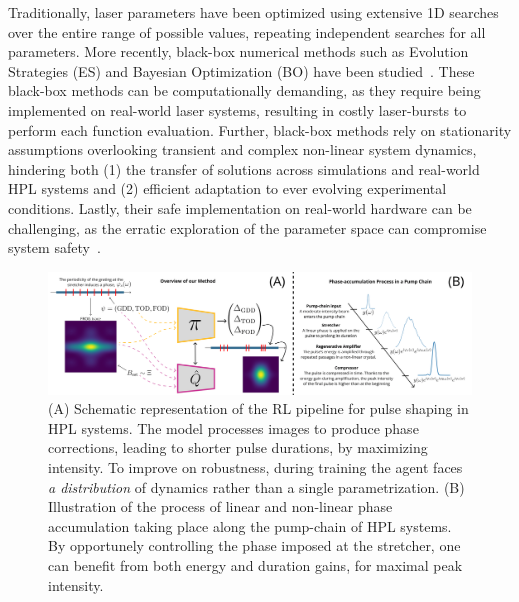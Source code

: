 Traditionally, laser parameters have been optimized using extensive 1D searches over the entire range of possible values, repeating independent searches for all parameters. 
More recently, black-box numerical methods such as Evolution Strategies (ES) and Bayesian Optimization (BO) have been studied~\citep{loughran2023automated, shalloo2020automation, capuano2022laser, arteaga2014supercontinuum}. 
These black-box methods can be computationally demanding, as they require being implemented on real-world laser systems, resulting in costly laser-bursts to perform each function evaluation. 
Further, black-box methods rely on stationarity assumptions overlooking transient and complex non-linear system dynamics, hindering both (1) the transfer of solutions across simulations and real-world HPL systems and (2) efficient adaptation to ever evolving experimental conditions.
Lastly, their safe implementation on real-world hardware can be challenging, as the erratic exploration of the parameter space can compromise system safety~\citep{capuano2023temporl}.

\begin{figure}
    \centering
    \includegraphics[width=\linewidth]{images/Figure1_and_CPA_edit_lowres.png}
    \caption{(A) Schematic representation of the RL pipeline for pulse shaping in HPL systems. The model processes images to produce phase corrections, leading to shorter pulse durations, by maximizing intensity. To improve on robustness, during training the agent faces \textit{a distribution} of dynamics rather than a single parametrization. (B) Illustration of the process of linear and non-linear phase accumulation taking place along the pump-chain of HPL systems. By opportunely controlling the phase imposed at the stretcher, one can benefit from both energy and duration gains, for maximal peak intensity.}
    \label{fig:figure1_and_cpa}
\end{figure}

